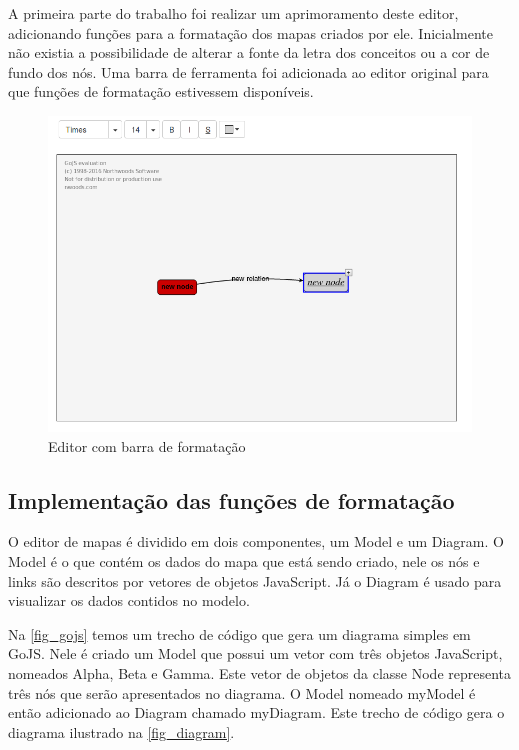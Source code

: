 \documentclass[
	12pt,				%
	openright,			%
	oneside,			%
	a4paper,			%
	english,			%
	french,				%
	spanish,			%
	brazil				%
	]{abntex2}
\begin{document}
A primeira parte do trabalho foi realizar um aprimoramento deste editor, adicionando funções para a formatação dos mapas criados por ele. Inicialmente não existia a possibilidade de alterar a fonte da letra dos conceitos ou a cor de fundo dos nós. Uma barra de ferramenta foi adicionada ao editor original para que funções de formatação estivessem disponíveis.

\begin{figure}[htb]
	\caption{\label{fig_barraformacao} Editor com barra de formatação}
	\begin{center}
		\includegraphics[scale=0.5]{barraformacao.png}
	\end{center}
\end{figure}

\subsection{Implementação das funções de formatação}
O editor de mapas é dividido em dois componentes, um Model e um Diagram. O Model é o que contém os dados do mapa que está sendo criado, nele os nós e links são descritos por vetores de objetos JavaScript. Já o Diagram é usado para visualizar os dados contidos no modelo.

Na \autoref{fig_gojs} temos um trecho de código que gera um diagrama simples em GoJS. Nele é criado um Model que possui um vetor com três objetos JavaScript, nomeados Alpha, Beta e Gamma. Este vetor de objetos da classe Node representa três nós que serão apresentados no diagrama. O Model nomeado myModel é então adicionado ao Diagram chamado myDiagram. Este trecho de código gera o diagrama ilustrado na \autoref{fig_diagram}.
\end{document}
